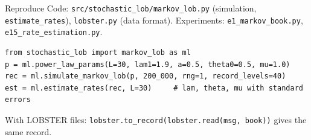 \documentclass[aspectratio=169,10pt]{beamer}
\begin{document}
\begin{frame}[fragile]{Reproduce}
  \small
  Code: \texttt{src/stochastic\_lob/markov\_lob.py} (simulation, \texttt{estimate\_rates}), \texttt{lobster.py} (data format). Experiments: \texttt{e1\_markov\_book.py}, \texttt{e15\_rate\_estimation.py}.
\begin{verbatim}
from stochastic_lob import markov_lob as ml
p = ml.power_law_params(L=30, lam1=1.9, a=0.5, theta0=0.5, mu=1.0)
rec = ml.simulate_markov_lob(p, 200_000, rng=1, record_levels=40)
est = ml.estimate_rates(rec, L=30)     # lam, theta, mu with standard errors
\end{verbatim}
  With LOBSTER files: \texttt{lobster.to\_record(lobster.read(msg, book))} gives the same record.
\end{frame}

\deckreferences
\end{document}
